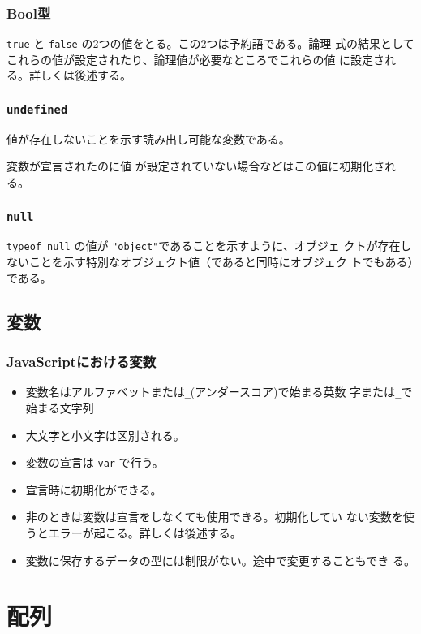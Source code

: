 \begin{frame}[containsverbatim]
 \frametitle{Bool型}
\Verb+true+ と \Verb+false+ の2つの値をとる。この2つは予約語である。論理
式の結果としてこれらの値が設定されたり、論理値が必要なところでこれらの値
に設定される。詳しくは後述する。
\end{frame}
\begin{frame}[containsverbatim]
 \frametitle{\texttt{undefined}}
値が存在しないことを示す読み出し可能な変数である。

変数が宣言されたのに値
が設定されていない場合などはこの値に初期化される。
\end{frame}
\begin{frame}[containsverbatim]
 \frametitle{\texttt{null}}
\Verb+typeof null+ の値が \Verb+"object"+であることを示すように、オブジェ
クトが存在しないことを示す特別なオブジェクト値（であると同時にオブジェク
トでもある）である。
\end{frame}
\subsection{変数}
\begin{frame}[containsverbatim]
 \frametitle{JavaScriptにおける変数}
\begin{itemize}
 \item 変数名はアルファベットまたは\Verb+_+(アンダースコア)で始まる英数
       字または\Verb+_+で始まる文字列
 \item 大文字と小文字は区別される。
 \item 変数の宣言は \texttt{var} で行う。
 \item 宣言時に初期化ができる。
 \item 非\Strict のときは変数は宣言をしなくても使用できる。初期化してい
       ない変数を使うとエラーが起こる。詳しくは後述する。
 \item 変数に保存するデータの型には制限がない。途中で変更することもでき
       る。
\end{itemize}
\end{frame}
\section{配列}

